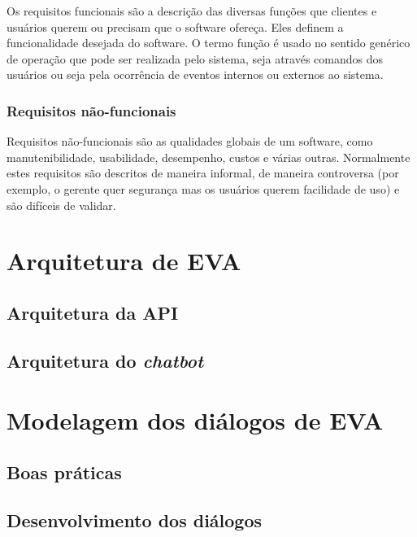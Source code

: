 Os requisitos funcionais são a descrição das diversas funções que clientes e usuários querem ou precisam que o software ofereça. Eles definem a funcionalidade desejada do software. O termo função é usado no sentido genérico de operação que pode ser realizada pelo sistema, seja através comandos dos usuários ou seja pela ocorrência de eventos internos ou externos ao sistema.


\subsubsection{Requisitos não-funcionais}

Requisitos não-funcionais são as qualidades globais de um software, como manutenibilidade, usabilidade, desempenho, custos e várias outras. Normalmente estes requisitos são descritos de maneira informal, de maneira controversa (por exemplo, o gerente quer segurança mas os usuários querem facilidade de uso) e são difíceis de validar.

\section{Arquitetura de EVA}

\subsection{Arquitetura da API}

\subsection{Arquitetura do \textit{chatbot}}

\section{Modelagem dos diálogos de EVA}

\subsection{Boas práticas}

\subsection{Desenvolvimento dos diálogos}